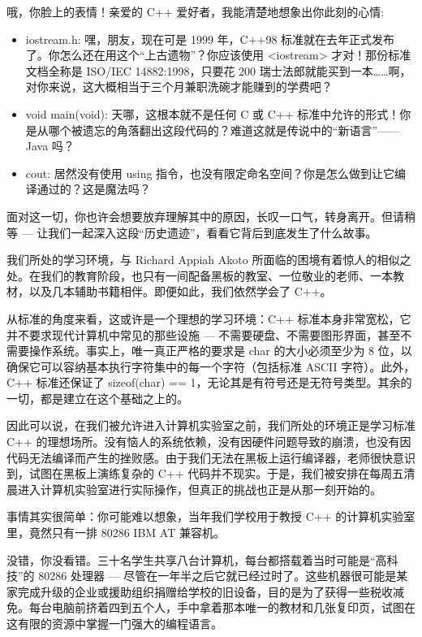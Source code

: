 
哦，你脸上的表情！亲爱的 C++ 爱好者，我能清楚地想象出你此刻的心情:

\begin{itemize}
\item 
iostream.h: 嘿，朋友，现在可是 1999 年，C++98 标准就在去年正式发布了。你怎么还在用这个“上古遗物”？你应该使用 <iostream> 才对！那份标准文档全称是 ISO/IEC 14882:1998，只要花 200 瑞士法郎就能买到一本……啊，对你来说，这大概相当于三个月兼职洗碗才能赚到的学费吧？

\item 
void main(void): 天哪，这根本就不是任何 C 或 C++ 标准中允许的形式！你是从哪个被遗忘的角落翻出这段代码的？难道这就是传说中的“新语言”——Java 吗？

\item 
cout: 居然没有使用 using 指令，也没有限定命名空间？你是怎么做到让它编译通过的？这是魔法吗？
\end{itemize}

面对这一切，你也许会想要放弃理解其中的原因，长叹一口气，转身离开。但请稍等 --- 让我们一起深入这段“历史遗迹”，看看它背后到底发生了什么故事。

我们所处的学习环境，与 Richard Appiah Akoto 所面临的困境有着惊人的相似之处。在我们的教育阶段，也只有一间配备黑板的教室、一位敬业的老师、一本教材，以及几本辅助书籍相伴。即便如此，我们依然学会了 C++。

从标准的角度来看，这或许是一个理想的学习环境：C++ 标准本身非常宽松，它并不要求现代计算机中常见的那些设施 --- 不需要硬盘、不需要图形界面，甚至不需要操作系统。事实上，唯一真正严格的要求是 char 的大小必须至少为 8 位，以确保它可以容纳基本执行字符集中的每一个字符（包括标准 ASCII 字符）。此外，C++ 标准还保证了 sizeof(char) == 1，无论其是有符号还是无符号类型。其余的一切，都是建立在这个基础之上的。

因此可以说，在我们被允许进入计算机实验室之前，我们所处的环境正是学习标准 C++ 的理想场所。没有恼人的系统依赖，没有因硬件问题导致的崩溃，也没有因代码无法编译而产生的挫败感。由于我们无法在黑板上运行编译器，老师很快意识到，试图在黑板上演练复杂的 C++ 代码并不现实。于是，我们被安排在每周五清晨进入计算机实验室进行实际操作，但真正的挑战也正是从那一刻开始的。

事情其实很简单：你可能难以想象，当年我们学校用于教授 C++ 的计算机实验室里，竟然只有一排 80286 IBM AT 兼容机。

没错，你没看错。三十名学生共享八台计算机，每台都搭载着当时可能是“高科技”的 80286 处理器 --- 尽管在一年半之后它就已经过时了。这些机器很可能是某家完成升级的企业或援助组织捐赠给学校的旧设备，目的是为了获得一些税收减免。每台电脑前挤着四到五个人，手中拿着那本唯一的教材和几张复印页，试图在这有限的资源中掌握一门强大的编程语言。

